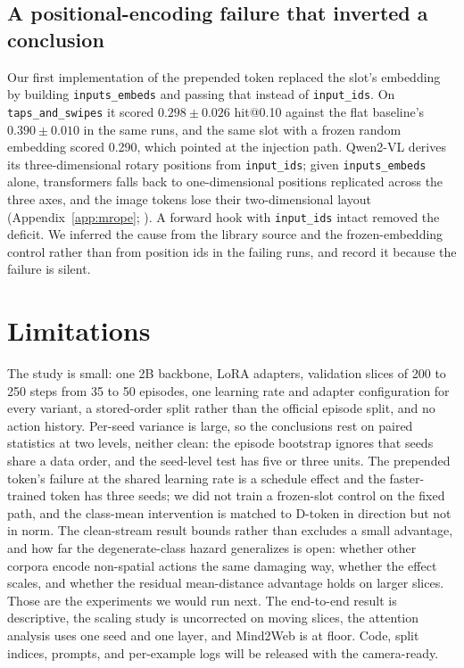 \documentclass{article}
\makeatletter
\newcommand{\hitat}[1]{hit@#1}
\newcommand{\mix}[1]{\texttt{#1}}
\makeatother
\begin{document}
\subsection{A positional-encoding failure that inverted a conclusion}
\label{sec:mrope}
Our first implementation of the prepended token replaced the slot's embedding by building \texttt{inputs\_embeds} and passing that instead of \texttt{input\_ids}. On \mix{taps\_and\_swipes} it scored $0.298 \pm 0.026$ \hitat{0.10} against the flat baseline's $0.390 \pm 0.010$ in the same runs, and the same slot with a frozen random embedding scored 0.290, which pointed at the injection path. Qwen2-VL derives its three-dimensional rotary positions from \texttt{input\_ids}; given \texttt{inputs\_embeds} alone, transformers falls back to one-dimensional positions replicated across the three axes, and the image tokens lose their two-dimensional layout (Appendix~\ref{app:mrope}; \citealp{hfissue35463}). A forward hook with \texttt{input\_ids} intact removed the deficit. We inferred the cause from the library source and the frozen-embedding control rather than from position ids in the failing runs, and record it because the failure is silent.

\section{Limitations}
\label{sec:limitations}
The study is small: one 2B backbone, LoRA adapters, validation slices of 200 to 250 steps from 35 to 50 episodes, one learning rate and adapter configuration for every variant, a stored-order split rather than the official episode split, and no action history. Per-seed variance is large, so the conclusions rest on paired statistics at two levels, neither clean: the episode bootstrap ignores that seeds share a data order, and the seed-level test has five or three units. The prepended token's failure at the shared learning rate is a schedule effect and the faster-trained token has three seeds; we did not train a frozen-slot control on the fixed path, and the class-mean intervention is matched to D-token in direction but not in norm. The clean-stream result bounds rather than excludes a small advantage, and how far the degenerate-class hazard generalizes is open: whether other corpora encode non-spatial actions the same damaging way, whether the effect scales, and whether the residual mean-distance advantage holds on larger slices. Those are the experiments we would run next. The end-to-end result is descriptive, the scaling study is uncorrected on moving slices, the attention analysis uses one seed and one layer, and Mind2Web is at floor. Code, split indices, prompts, and per-example logs will be released with the camera-ready.
\end{document}
